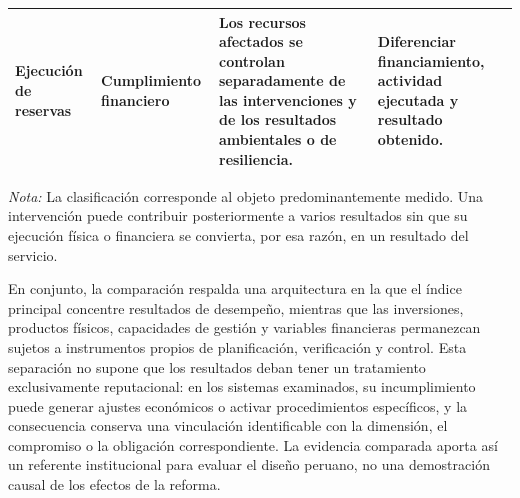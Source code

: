 \begin{table}[!t]
\begin{tabularx}{\textwidth}{
>{\raggedright\arraybackslash}p{3.0cm}
>{\raggedright\arraybackslash}p{3.0cm}
>{\raggedright\arraybackslash}X
>{\raggedright\arraybackslash}p{3.35cm}}
Ejecución de reservas
&
Cumplimiento financiero
&
Los recursos afectados se controlan separadamente de las intervenciones y de los resultados ambientales o de resiliencia.
&
Diferenciar financiamiento, actividad ejecutada y resultado obtenido.
\\
\hline
\end{tabularx}

\begin{minipage}{\textwidth}
\footnotesize
\textit{Nota:} La clasificación corresponde al objeto predominantemente medido. Una intervención puede contribuir posteriormente a varios resultados sin que su ejecución física o financiera se convierta, por esa razón, en un resultado del servicio.
\end{minipage}
\end{table}

En conjunto, la comparación respalda una arquitectura en la que el índice principal concentre resultados de desempeño, mientras que las inversiones, productos físicos, capacidades de gestión y variables financieras permanezcan sujetos a instrumentos propios de planificación, verificación y control. Esta separación no supone que los resultados deban tener un tratamiento exclusivamente reputacional: en los sistemas examinados, su incumplimiento puede generar ajustes económicos o activar procedimientos específicos, y la consecuencia conserva una vinculación identificable con la dimensión, el compromiso o la obligación correspondiente. La evidencia comparada aporta así un referente institucional para evaluar el diseño peruano, no una demostración causal de los efectos de la reforma.
